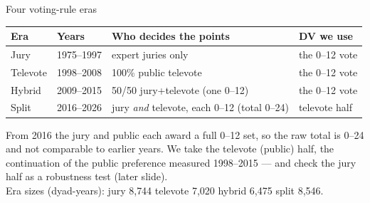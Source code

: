 \documentclass[aspectratio=169,10pt]{beamer}
\newcommand{\rep}[1]{{\color{repcol}#1}}
\newcommand{\spl}[1]{{\color{splitcol}#1}}
\begin{document}
\begin{frame}{Four voting-rule eras}
  \centering\small
  \renewcommand{\arraystretch}{1.3}
  \begin{tabular}{@{}l l l l@{}}
    \toprule
    Era & Years & Who decides the points & DV we use\\
    \midrule
    \rep{Jury}     & 1975--1997 & expert juries only            & the 0--12 vote\\
    \rep{Televote} & 1998--2008 & 100\% public televote         & the 0--12 vote\\
    \rep{Hybrid}   & 2009--2015 & 50/50 jury+televote (one 0--12) & the 0--12 vote\\
    \rowcolor{splitcol!12}
    \spl{Split}    & 2016--2026 & jury \emph{and} televote, each 0--12 (total 0--24) & \spl{televote half}\\
    \bottomrule
  \end{tabular}

  \vspace{8pt}
  \footnotesize
  From 2016 the jury and public each award a full 0--12 set, so the raw total is
  0--24 and not comparable to earlier years.  We take the \spl{televote (public)
  half}, the continuation of the public preference measured 1998--2015 --- and check
  the jury half as a robustness test (later slide). \\
  \rep{Era sizes (dyad-years):} jury 8{,}744 \; televote 7{,}020 \; hybrid 6{,}475 \;
  \spl{split 8{,}546}.
\end{frame}
\end{document}
